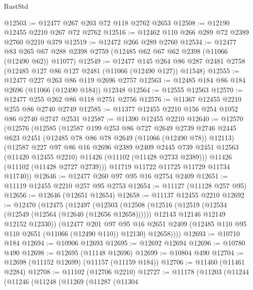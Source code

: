 \begin{lexlean}{RustStd}
\begin{coremodule}
@12503 := @12477 @267 @203 @72 @118 @2762 @2653
@12508 := @12190 @12455 @2210 @267 @72 @2762
@12516 := @12462 @110 @266 @289 @72 @2389 @2760 @2210 @379
@12519 := @12472 @266 @289 @2760
@12534 := @12477
    @83
    @265
    @67
    @288
    @2398
    @2759
    (@12485 @62 @67 @62 @2398 (@11066 (@12490 @62)) @11077)
@12549 := @12477
    @145
    @264
    @86
    @287
    @2481
    @2758
    (@12485 @127 @86 @127 @2481 (@11066 (@12490 @127)) @11548)
@12555 := @12477 @227 @263 @86 @119 @2696 @2757
@12563 := @12485 @184 @86 @184 @2696 (@11066 (@12490 @184)) @12348
@12564 := @12555 @12563
@12570 := @12477 @255 @262 @86 @118 @2751 @2756
@12576 := @11367 @12455 @2210 @255 @86 @2740 @2749
@12585 := @11377 @12455 @2210 @156 @254 @1052 @86 @2740 @2747 @2531
@12587 := @11390 @12455 @2210
@12640 := @12570
    (@12576
      (@12585
        (@12587
          @199
          @253
          @86
          @727
          @2649
          @2739
          @2746
          @2445
          @623
          @2451
          (@12485 @78 @86 @78 @2649 (@11066 (@12490 @78)) @12113)
          (@12587
            @227
            @97
            @86
            @16
            @2696
            @2389
            @2409
            @2445
            @739
            @2451
            @12563
            (@11420 @12455 @2210)
            @11426
            (@11102 (@11428 @2733 @2389)))
          @11426
          (@11102 (@11428 @2727 @2739)))
        @11719
        @11722
        @11725
        @11729
        @11734
        @11740))
@12646 := @12477 @260 @97 @95 @16 @2754 @2409
@12651 := @11119 @12455 @2210 @257 @95 @2753
@12654 := @11127 (@11128 @257 @95)
@12656 := @12646 (@12651 @12654)
@12658 := @11137 @12455 @2210
@12692 := @12470
    (@12475
      (@12497
        (@12503
          (@12508
            (@12516
              (@12519 (@12534 (@12549 (@12564 (@12640 (@12656 @12658))))))
              @12143
              @12146
              @12149
              @12152
              @12330))
          (@12477
            @201
            @97
            @95
            @16
            @2651
            @2409
            (@12485 @110 @95 @110 @2651 (@11066 (@12490 @110)) @12130)
            @12658))))
@12693 := @10710 @184
@12694 := @10906 @12693
@12695 := @12692 @12694
@12696 := @10780 @490
@12698 := @12695 (@11148 @12696)
@12699 := @10804 @490
@12704 := @12698 (@11152 @12699) (@11157 (@11159 @184))
@12706 := @11460 (@11461 @2284)
@12708 := @11102 (@12706 @2210)
@12727 := @11178
    (@11203
      (@11244
        (@11246
          (@11248
            (@11269
              (@11287
                (@11304

\end{coremodule}
\end{lexlean}
